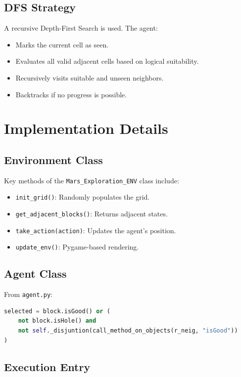 \documentclass[12pt]{article}
\begin{document}
\subsection{DFS Strategy}

A recursive Depth-First Search is used. The agent:
\begin{itemize}
    \item Marks the current cell as seen.
    \item Evaluates all valid adjacent cells based on logical suitability.
    \item Recursively visits suitable and unseen neighbors.
    \item Backtracks if no progress is possible.
\end{itemize}

\section{Implementation Details}

\subsection{Environment Class}

Key methods of the \texttt{Mars\_Exploration\_ENV} class include:
\begin{itemize}
    \item \texttt{init\_grid()}: Randomly populates the grid.
    \item \texttt{get\_adjacent\_blocks()}: Returns adjacent states.
    \item \texttt{take\_action(action)}: Updates the agent's position.
    \item \texttt{update\_env()}: Pygame-based rendering.
\end{itemize}

\subsection{Agent Class}

From \texttt{agent.py}:
\begin{lstlisting}[language=Python, caption=Suitability Evaluation]
selected = block.isGood() or (
    not block.isHole() and 
    not self._disjuntion(call_method_on_objects(r_neig, "isGood"))
)
\end{lstlisting}

\subsection{Execution Entry}
\end{document}
